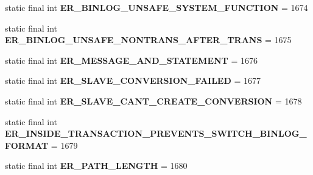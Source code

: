 \begin{DoxyCompactItemize}
static final int {\bfseries E\+R\+\_\+\+B\+I\+N\+L\+O\+G\+\_\+\+U\+N\+S\+A\+F\+E\+\_\+\+S\+Y\+S\+T\+E\+M\+\_\+\+F\+U\+N\+C\+T\+I\+ON} = 1674
\item 
\mbox{\label{classcom_1_1mysql_1_1jdbc_1_1_mysql_error_numbers_a6533fb6d7fcbbd628361f44ac89629be}} 
static final int {\bfseries E\+R\+\_\+\+B\+I\+N\+L\+O\+G\+\_\+\+U\+N\+S\+A\+F\+E\+\_\+\+N\+O\+N\+T\+R\+A\+N\+S\+\_\+\+A\+F\+T\+E\+R\+\_\+\+T\+R\+A\+NS} = 1675
\item 
\mbox{\label{classcom_1_1mysql_1_1jdbc_1_1_mysql_error_numbers_a06d49fd9931b159ec1013b51e19d00bb}} 
static final int {\bfseries E\+R\+\_\+\+M\+E\+S\+S\+A\+G\+E\+\_\+\+A\+N\+D\+\_\+\+S\+T\+A\+T\+E\+M\+E\+NT} = 1676
\item 
\mbox{\label{classcom_1_1mysql_1_1jdbc_1_1_mysql_error_numbers_a4c68fc3778fefa5d9585d5608044f993}} 
static final int {\bfseries E\+R\+\_\+\+S\+L\+A\+V\+E\+\_\+\+C\+O\+N\+V\+E\+R\+S\+I\+O\+N\+\_\+\+F\+A\+I\+L\+ED} = 1677
\item 
\mbox{\label{classcom_1_1mysql_1_1jdbc_1_1_mysql_error_numbers_a822c0825b6d203bcdf76c2a1ffd30c1c}} 
static final int {\bfseries E\+R\+\_\+\+S\+L\+A\+V\+E\+\_\+\+C\+A\+N\+T\+\_\+\+C\+R\+E\+A\+T\+E\+\_\+\+C\+O\+N\+V\+E\+R\+S\+I\+ON} = 1678
\item 
\mbox{\label{classcom_1_1mysql_1_1jdbc_1_1_mysql_error_numbers_ab7aa2b3503d7eb700b9ce5de67e4b82b}} 
static final int {\bfseries E\+R\+\_\+\+I\+N\+S\+I\+D\+E\+\_\+\+T\+R\+A\+N\+S\+A\+C\+T\+I\+O\+N\+\_\+\+P\+R\+E\+V\+E\+N\+T\+S\+\_\+\+S\+W\+I\+T\+C\+H\+\_\+\+B\+I\+N\+L\+O\+G\+\_\+\+F\+O\+R\+M\+AT} = 1679
\item 
\mbox{\label{classcom_1_1mysql_1_1jdbc_1_1_mysql_error_numbers_a226c5e4bbcd89fc386713c6e04fdc6e8}} 
static final int {\bfseries E\+R\+\_\+\+P\+A\+T\+H\+\_\+\+L\+E\+N\+G\+TH} = 1680
\item 
\mbox{\label{classcom_1_1mysql_1_1jdbc_1_1_mysql_error_numbers_a2ba2e2e38cbef0f10358c35c3af06d69}} 

\end{DoxyCompactItemize}
